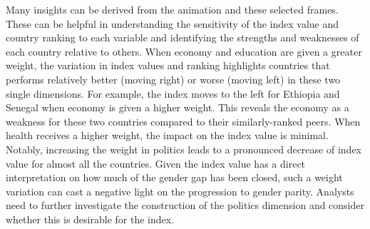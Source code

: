 \documentclass[
]{interact}
\begin{document}
Many insights can be derived from the animation and these selected
frames. These can be helpful in understanding the sensitivity of the
index value and country ranking to each variable and identifying the
strengths and weaknesses of each country relative to others. When
economy and education are given a greater weight, the variation in index
values and ranking highlights countries that performs relatively better
(moving right) or worse (moving left) in these two single dimensions.
For example, the index moves to the left for Ethiopia and Senegal when
economy is given a higher weight. This reveals the economy as a weakness
for these two countries compared to their similarly-ranked peers. When
health receives a higher weight, the impact on the index value is
minimal. Notably, increasing the weight in politics leads to a
pronounced decrease of index value for almost all the countries. Given
the index value has a direct interpretation on how much of the gender
gap has been closed, such a weight variation can cast a negative light
on the progression to gender parity. Analysts need to further
investigate the construction of the politics dimension and consider
whether this is desirable for the index.
\end{document}
